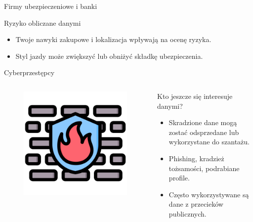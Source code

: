     
    \begin{frame}{Firmy ubezpieczeniowe i banki}
    \begin{alertblock}{Ryzyko obliczane danymi}
        \begin{itemize}
          \item Twoje nawyki zakupowe i lokalizacja wpływają na ocenę ryzyka.
          \item Styl jazdy może zwiększyć lub obniżyć składkę ubezpieczenia.
        \end{itemize}
    \end{alertblock}
    \end{frame}
    
    
    \begin{frame}{Cyberprzestępcy}
    \begin{columns}[c]
        \begin{figure}
          \centering
          \includegraphics[height=0.45\textheight]{images/firewall.png}
        \end{figure}
        \begin{alertblock}{Kto jeszcze się interesuje danymi?}
            \begin{itemize}
              \item Skradzione dane mogą zostać odsprzedane lub wykorzystane do szantażu.
              \item Phishing, kradzież tożsamości, podrabiane profile.\cite{PHISHING_REPORT}
              \item Często wykorzystywane są dane z przecieków publicznych.
            \end{itemize}
        \end{alertblock}
    \end{columns}
    \end{frame}
    
